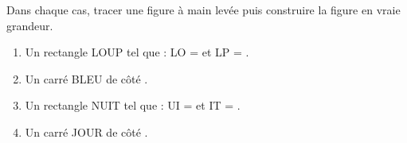 
\begin{exercice*} %
   Dans chaque cas, tracer une figure à main levée puis construire la figure en vraie grandeur.   
   \begin{enumerate}
      \item Un rectangle LOUP tel que : LO =  et LP = .
      \item Un carré BLEU de côté .
      \item Un rectangle NUIT tel que : UI =  et IT = .
      \item Un carré JOUR de côté .
   \end{enumerate}
\end{exercice*}
